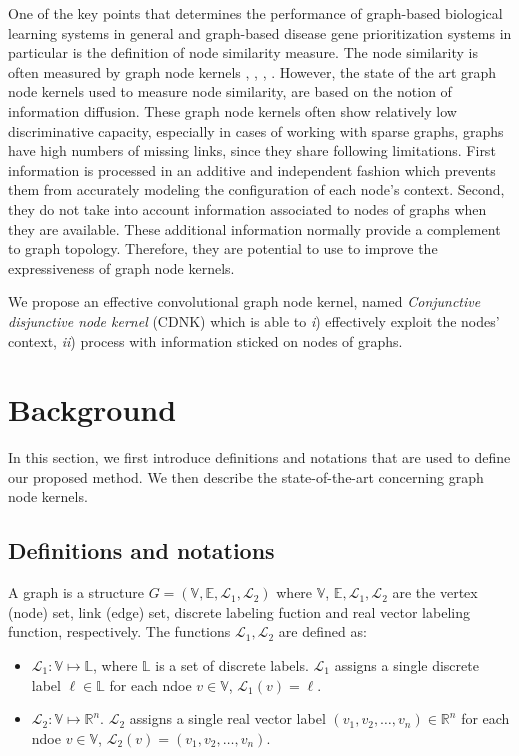 \documentclass[review]{elsarticle}
\begin{document}
One of the key points that determines the performance of graph-based biological learning systems in general and graph-based disease gene prioritization systems in particular is the definition of node similarity measure. The node similarity is often measured by graph node kernels \cite{kondor2002diffusion}, \cite{chen2014disease}, \cite{fouss2006experimental}, \cite{chebotarev2006matrix}. However, the state of the art graph node kernels used to measure node similarity, are based on the notion of information diffusion. These graph node kernels often show relatively low discriminative capacity, especially in cases of working with sparse graphs, graphs have high numbers of missing links, since they share following limitations. First information is processed in an additive and independent fashion which prevents them from accurately modeling the configuration of each node's context. Second, they do not take into account information associated to nodes of graphs when they are available. These additional information normally provide a complement to graph topology. Therefore, they are potential to use to improve the expressiveness of graph node kernels. 

We propose an effective convolutional graph node kernel, named \textit{Conjunctive disjunctive node kernel} (CDNK) which is able to \textit{i}) effectively exploit the nodes' context, \textit{ii}) process with information sticked on nodes of graphs.

\section{Background}
In this section, we first introduce definitions and notations that are used to define our proposed method. We then describe the state-of-the-art concerning graph node kernels.
\subsection{Definitions and notations}
A graph is a structure $G=(\mathbb{V},\mathbb{E}, \mathcal{L}_1, \mathcal{L}_2)$ where $\mathbb{V}$, $\mathbb{E}, \mathcal{L}_1, \mathcal{L}_2$ are the vertex (node) set, link (edge) set, discrete labeling fuction and real vector labeling function, respectively. The functions $\mathcal{L}_1, \mathcal{L}_2$ are defined as:
\begin{itemize}
\item $\mathcal{L}_1: \mathbb{V} \longmapsto \mathbb{L}$, where $\mathbb{L}$ is a set of discrete labels. $\mathcal{L}_1$ assigns a single discrete label $\ell \in \mathbb{L}$ for each ndoe $v \in \mathbb{V}$, $\mathcal{L}_1(v) = \ell$. 
\item $\mathcal{L}_2: \mathbb{V} \longmapsto \mathbb{R}^n$. $\mathcal{L}_2$ assigns a single real vector label $(v_1,v_2,\ldots,v_n) \in \mathbb{R}^n$ for each ndoe $v \in \mathbb{V}$, $\mathcal{L}_2(v) = (v_1,v_2,\ldots,v_n)$.
\end{itemize}
\end{document}

